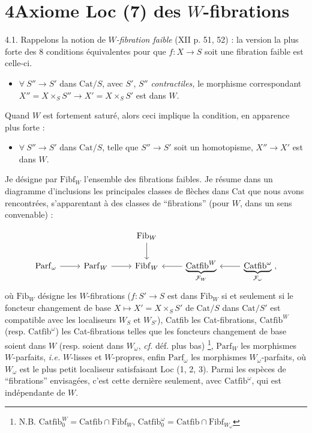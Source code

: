 \documentclass[11pt]{article}
\newcommand{\printedpage}[1]{\marginpar{\footnotesize p.~#1}}
\newcommand{\msp}[1]{\marginpar{\footnotesize [#1]}}
\newcommand{\Fib}{\mathrm{Fib}}
\newcommand{\Fibf}{\mathrm{Fibf}}
\newcommand{\Parf}{\mathrm{Parf}}
\newcommand{\Catfib}{\mathrm{Catfib}}
\newcommand{\Cat}{\mathrm{Cat}}
\begin{document}
\printedpage{19}

\section*{4\quad Axiome Loc (7) des $W$-fibrations}

4.1. Rappelons la notion de \textit{$W$-fibration faible} (XII p. 51, 52) : la version la plus forte des 8 conditions équivalentes pour que $f : X \longrightarrow S$ soit une fibration faible est celle-ci.

\begin{itemize}[leftmargin=2cm]
\item[\textbf{(Ff)}] $\forall\ S'' \longrightarrow S'$ dans $\Cat/S$, avec $S'$, $S''$ \textit{contractiles,} le morphisme correspondant $X'' = X \times_S S'' \longrightarrow X' = X \times_S S'$ est dans $W$.
\end{itemize}

Quand $W$ est fortement saturé, alors ceci implique la condition, en apparence plus forte :

\begin{itemize}[leftmargin=2cm]
\item[\textbf{(Ff$'$)}] $\forall\ S'' \longrightarrow S'$ dans $\Cat/S$, telle que $S'' \longrightarrow S'$ soit un homotopisme, $X'' \longrightarrow X'$ est dans $W$.
\end{itemize}

Je désigne par $\Fibf_W$ l'ensemble des fibrations faibles. Je résume dans un diagramme d'inclusions les principales classes de flèches dans Cat que nous avons rencontrées, s'apparentant à des classes de “fibrations” (pour $W$, dans un sens convenable) :

\msp{page 28}

\[
\begin{tikzcd}
 & & \Fib_W \arrow[d] & & \\
\Parf_\omega \arrow[r] & \Parf_W \arrow[r] & \Fibf_W & \underbrace{\Catfib^W}_{\mathcal{F}_W} \arrow[l] & \underbrace{\Catfib^\omega}_{\mathcal{F}_\omega} \arrow[l] \ ,
\end{tikzcd}
\]
où $\Fib_W$ désigne les $W$-fibrations ($f : S' \longrightarrow S$ est dans $\Fib_W$ si et seulement si le foncteur changement de base $X \longmapsto X' = X \times_S S'$ de $\Cat/S$ dans $\Cat/S'$ est compatible avec les localiseurs $W_S$ et $W_{S'}$), Catfib les Cat-fibrations, $\Catfib^W$ (resp. $\Catfib^\omega$) les Cat-fibrations telles que les foncteurs changement de base soient dans $W$ (resp. soient dans $W_\omega$, \textit{cf.} déf. plus bas) \footnote[20]{N.B. $\Catfib_0^W = \Catfib \cap \Fibf_W$, $\Catfib_0^\omega = \Catfib \cap \Fibf_{W_\omega}$}, $\Parf_W$ les morphismes $W$-parfaits, \textit{i.e.} $W$-lisses et $W$-propres, enfin $\Parf_\omega$ les morphismes $W_\omega$-parfaits, où $W_\omega$ est le plus petit localiseur satisfaisant Loc (1, 2, 3). Parmi les espèces de “fibrations” envisagées, c'est cette dernière seulement, avec $\Catfib^\omega$, qui est indépendante de $W$.
\end{document}
